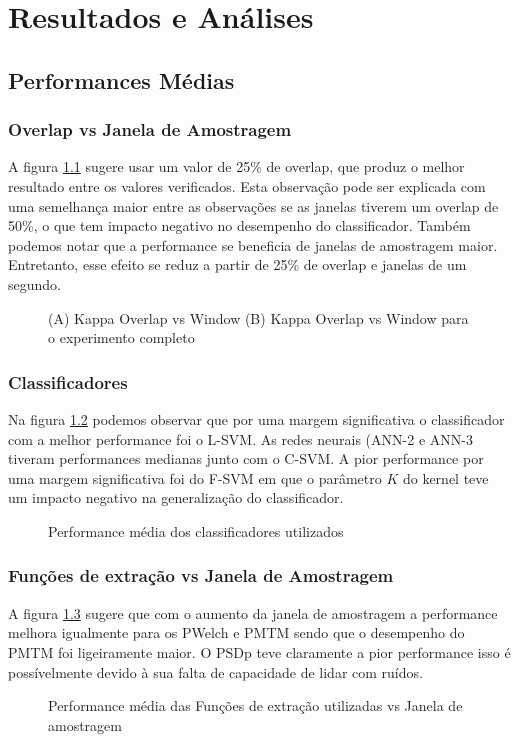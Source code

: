 \chapter{Resultados e An\'alises} \label{lab_Resultados}
\section{Performances M\'edias}
\subsection{Overlap vs Janela de Amostragem}
\par
A figura \ref{fig:kappa-over-vs-win} sugere usar um valor de 25\% de overlap, que produz o melhor resultado entre os valores verificados. Esta observa\c{c}\~ao pode ser explicada com uma semelhan\c{c}a maior entre as observa\c{c}\~oes se as janelas tiverem um overlap de 50\%, o que tem impacto negativo no desempenho do classificador.
Tamb\'em podemos notar que a performance se beneficia de janelas de amostragem maior. Entretanto, esse efeito se reduz a partir de 25\% de overlap e janelas de um segundo.
\begin{figure}[!h]
	\caption{(A) Kappa Overlap vs Window (B) Kappa Overlap vs Window para o experimento completo}
	\label{fig:kappa-over-vs-win}
	
	
\end{figure}
\subsection{Classificadores}
Na figura \ref{fig:ClassPerf} podemos observar que por uma margem significativa o classificador com a melhor performance foi o  \ac{L-SVM}. As redes neurais (\acs{ANN-2} e \acs{ANN-3} tiveram performances medianas junto com o \ac{C-SVM}.
 A pior performance por uma margem significativa foi do \ac{F-SVM} em que o parâmetro $K$ do kernel teve um impacto negativo na generaliza\c{c}\~ao do classificador. 
\begin{figure}[h]
	\caption{Performance m\'edia dos classificadores utilizados}
	\label{fig:ClassPerf}
	\centering
	
\end{figure}
\subsection{Fun\c{c}\~oes de extra\c{c}\~ao vs Janela de Amostragem}
A figura \ref{fig:PSDPerf} sugere que com o aumento da janela de amostragem a performance melhora igualmente para os \ac{PWelch} e \ac{PMTM} sendo que o desempenho do \ac{PMTM} foi ligeiramente maior. O \ac{PSDp} teve claramente a pior performance isso \'e poss\'ivelmente devido \`a sua falta de capacidade de lidar com ru\'idos. 
\begin{figure}[h]
	\caption{Performance m\'edia das Fun\c{c}\~oes de extra\c{c}\~ao utilizadas vs Janela de amostragem}
	\label{fig:PSDPerf}
	\centering
	
\end{figure}
